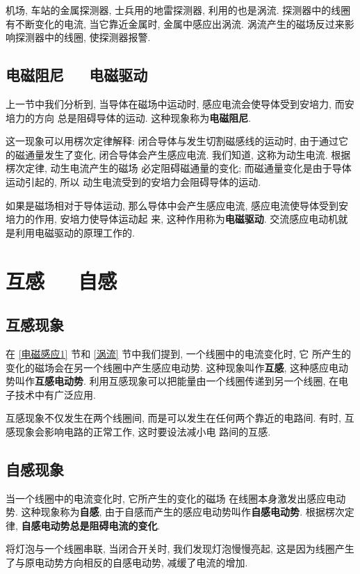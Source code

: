 \documentclass[11pt,a4paper]{ctexbook}
\newcommand{\bre}{\ \ \ }
\begin{document}
机场, 车站的金属探测器, 士兵用的地雷探测器, 利用的也是涡流.
探测器中的线圈有不断变化的电流, 当它靠近金属时, 金属中感应出涡流.
涡流产生的磁场反过来影响探测器中的线圈, 使探测器报警.

\subsection{电磁阻尼\bre 电磁驱动}

上一节中我们分析到, 当导体在磁场中运动时, 感应电流会使导体受到安培力, 而安培力的方向
总是阻碍导体的运动. 这种现象称为\textbf{电磁阻尼}.

这一现象可以用楞次定律解释: 闭合导体与发生切割磁感线的运动时,
由于通过它的磁通量发生了变化, 闭合导体会产生感应电流.
我们知道, 这称为动生电流. 根据楞次定律, 动生电流产生的磁场
必定阻碍磁通量的变化; 而磁通量变化是由于导体运动引起的, 所以
动生电流受到的安培力会阻碍导体的运动.

如果是磁场相对于导体运动, 那么导体中会产生感应电流,
感应电流使导体受到安培力的作用, 安培力使导体运动起
来, 这种作用称为\textbf{电磁驱动}.
交流感应电动机就是利用电磁驱动的原理工作的.

\section{互感\bre 自感}
\subsection{互感现象}
在 \ref{电磁感应1} 节和 \ref{涡流} 节中我们提到, 一个线圈中的电流变化时, 它
所产生的变化的磁场会在另一个线圈中产生感应电动势.
这种现象叫作\textbf{互感}, 这种感应电动势叫作\textbf{互感电动势}.
利用互感现象可以把能量由一个线圈传递到另一个线圈, 在电子技术中有广泛应用.

互感现象不仅发生在两个线圈间, 而是可以发生在任何两个靠近的电路间.
有时, 互感现象会影响电路的正常工作, 这时要设法减小电
路间的互感.

\subsection{自感现象}
当一个线圈中的电流变化时, 它所产生的变化的磁场
在线圈本身激发出感应电动势. 这种现象称为\textbf{自感},
由于自感而产生的感应电动势叫作\textbf{自感电动势}.
根据楞次定律, \textbf{自感电动势总是阻碍电流的变化}.

将灯泡与一个线圈串联, 当闭合开关时, 我们发现灯泡慢慢亮起, 这是因为线圈产生了与原电动势方向相反的自感电动势, 减缓了电流的增加.
\end{document}
